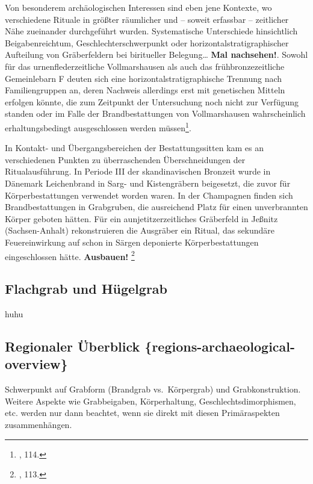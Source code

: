 \documentclass[openany,twoside,twocolumn]{book}
\let\rmarkdownfootnote\footnote%
\def\footnote{\protect\rmarkdownfootnote}
\begin{document}
Von besonderem archäologischen Interessen sind eben jene Kontexte, wo
verschiedene Rituale in größter räumlicher und -- soweit erfassbar --
zeitlicher Nähe zueinander durchgeführt wurden. Systematische
Unterschiede hinsichtlich Beigabenreichtum, Geschlechterschwerpunkt oder
horizontalstratigraphischer Aufteilung von Gräberfeldern bei biritueller
Belegung\ldots{} \textbf{Mal nachsehen!}. Sowohl für das
urnenflederzeitliche Vollmarshausen als auch das frühbronzezeitliche
Gemeinlebarn F deuten sich eine horizontalstratigraphische Trennung nach
Familiengruppen an, deren Nachweis allerdings erst mit genetischen
Mitteln erfolgen könnte, die zum Zeitpunkt der Untersuchung noch nicht
zur Verfügung standen oder im Falle der Brandbestattungen von
Vollmarshausen wahrscheinlich erhaltungsbedingt ausgeschlossen werden
müssen\footnote{\textcite{harding_european_2000}, 114.}.

In Kontakt- und Übergangsbereichen der Bestattungssitten kam es an
verschiedenen Punkten zu überraschenden Überschneidungen der
Ritualausführung. In Periode III der skandinavischen Bronzeit wurde in
Dänemark Leichenbrand in Sarg- und Kistengräbern beigesetzt, die zuvor
für Körperbestattungen verwendet worden waren. In der Champagnen finden
sich Brandbestattungen in Grabgruben, die ausreichend Platz für einen
unverbrannten Körper geboten hätten. Für ein aunjetitzerzeitliches
Gräberfeld in Jeßnitz (Sachsen-Anhalt) rekonstruieren die Ausgräber ein
Ritual, das sekundäre Feuereinwirkung auf schon in Särgen deponierte
Körperbestattungen eingeschlossen hätte. \textbf{Ausbauen!} \footnote{\textcite{harding_european_2000},
  113.}

\hypertarget{flachgrab-und-hugelgrab}{%
\subsection{Flachgrab und Hügelgrab}\label{flachgrab-und-hugelgrab}}

huhu

\hypertarget{regionaler-uberblick-regions-archaeological-overview}{%
\subsection{Regionaler Überblick
\{regions-archaeological-overview\}}\label{regionaler-uberblick-regions-archaeological-overview}}

Schwerpunkt auf Grabform (Brandgrab vs.~Körpergrab) und
Grabkonstruktion. Weitere Aspekte wie Grabbeigaben, Körperhaltung,
Geschlechtsdimorphismen, etc. werden nur dann beachtet, wenn sie direkt
mit diesen Primäraspekten zusammenhängen.
\end{document}
